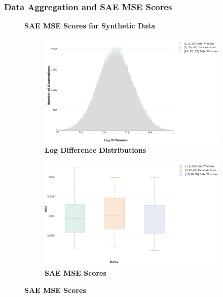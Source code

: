 \documentclass[a4paper,11pt,oneside]{article}
\theoremstyle{plain}
\theoremstyle{definition}
\begin{document}
	
	\subsubsection{Data Aggregation and SAE MSE Scores}\label{results_data_mse}
	
	\begin{figure}[H]
		\centering
		\textbf{SAE MSE Scores for Synthetic Data}
		\begin{subfigure}{.5\textwidth}
			\centering 
			\includegraphics[scale=0.25]{images/results/data/test_aggregate_dist.png}
			\caption{\textbf{Log Difference Distributions} 
				\newline }
			\label{figure-test_aggregate_dist}
		\end{subfigure}%
		\begin{subfigure}{.5\textwidth}
			\centering 
			\includegraphics[scale=0.26]{images/results/data/test_aggregation_mse.png}
			\caption{\textbf{SAE MSE Scores} 
				\newline }
			\label{figure-test_aggregation_mse}
		\end{subfigure}

\end{figure}
\end{document}
